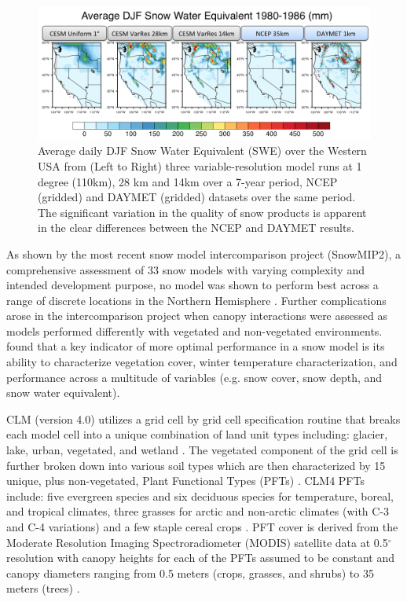 \documentclass[11pt]{article}
\begin{document}
\begin{figure}
\begin{center}
\includegraphics[width=\textwidth]{VariableResolutionSWE2.png}
\end{center}
\caption{Average daily DJF Snow Water Equivalent (SWE) over the Western USA from (Left to Right) three variable-resolution model runs at 1 degree (110km), 28 km and 14km over a 7-year period, NCEP (gridded) and DAYMET (gridded) datasets over the same period.  The significant variation in the quality of snow products is apparent in the clear differences between the NCEP and DAYMET results.} \label{fig:VarResSWE}
\end{figure}

As shown by the most recent snow model intercomparison project (SnowMIP2), a comprehensive assessment of 33 snow models with varying complexity and intended development purpose, no model was shown to perform best across a range of discrete locations in the Northern Hemisphere \citep{rutter2009SnowMIP2}.  Further complications arose in the intercomparison project when canopy interactions were assessed as models performed differently with vegetated and non-vegetated environments.  \citet{rutter2009SnowMIP2} found that a key indicator of more optimal performance in a snow model is its ability to characterize vegetation cover, winter temperature characterization, and performance across a multitude of variables (e.g. snow cover, snow depth, and snow water equivalent).
    
CLM (version 4.0) utilizes a grid cell by grid cell specification routine that breaks each model cell into a unique combination of land unit types including: glacier, lake, urban, vegetated, and wetland \citep{lawrence2011parameterization}.  The vegetated component of the grid cell is further broken down into various soil types which are then characterized by 15 unique, plus non-vegetated, Plant Functional Types (PFTs) \citep{lawrence2011parameterization}. CLM4 PFTs include: five evergreen species and six deciduous species for temperature, boreal, and tropical climates, three grasses for arctic and non-arctic climates (with C-3 and C-4 variations) and a few staple cereal crops \citep{lawrence2011parameterization}.  PFT cover is derived from the Moderate Resolution Imaging Spectroradiometer (MODIS) satellite data at 0.5$^\circ$ resolution with canopy heights for each of the PFTs assumed to be constant and canopy diameters ranging from 0.5 meters (crops, grasses, and shrubs) to 35 meters (trees) \citep{lawrence2011parameterization}.  
\end{document}
